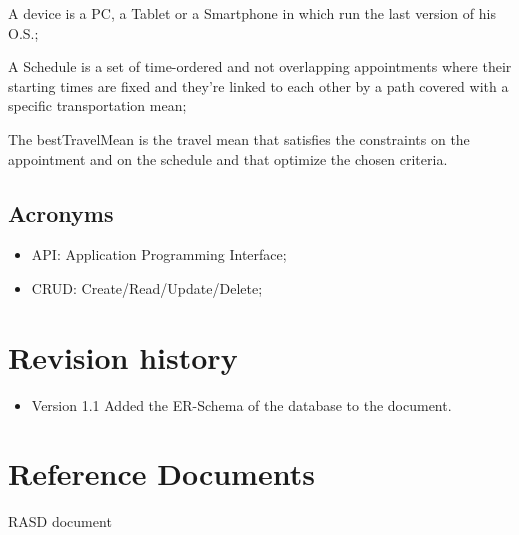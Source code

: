 \begin{definition} \label{def:device}
A device is a PC, a Tablet or a Smartphone in which run the last version of his O.S.;
\end{definition}

\begin{definition} \label{def:schedule}
A Schedule is a set of time-ordered and not overlapping appointments where their starting times are fixed and they're linked to each other by a path covered with a specific transportation mean;
\end{definition}

\begin{definition} \label{def:bestTravelMean}
The bestTravelMean is the travel mean that satisfies the constraints on the appointment and on the schedule and that optimize the chosen criteria.
\end{definition}


\subsection{Acronyms}
\begin{itemize}
\item API: Application Programming Interface;
\item CRUD: Create/Read/Update/Delete;
\end{itemize}


\section{Revision history}
\begin{itemize}
\item Version 1.1 Added the ER-Schema of the database to the document.
\end{itemize}


\section{Reference Documents}
RASD document

